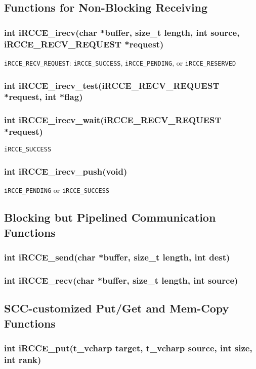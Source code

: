 \documentclass[fontsize=10pt, paper=a4, DIV12, pagesize=auto]{scrartcl}
\begin{document}
\subsection{Functions for Non-Blocking Receiving}
\subsubsection{int iRCCE\_irecv(char *buffer, size\_t length, int source, iRCCE\_RECV\_REQUEST *request)}\vspace{-0.3cm}
\texttt{iRCCE\_RECV\_REQUEST}: \texttt{iRCCE\_SUCCESS}, \texttt{iRCCE\_PENDING}, or \texttt{iRCCE\_RESERVED}
\subsubsection{int iRCCE\_irecv\_test(iRCCE\_RECV\_REQUEST *request, int *flag)}\vspace{-0.3cm}
\subsubsection{int iRCCE\_irecv\_wait(iRCCE\_RECV\_REQUEST *request)}\vspace{-0.3cm}
\texttt{iRCCE\_SUCCESS}
\subsubsection{int iRCCE\_irecv\_push(void)}\vspace{-0.3cm}
\texttt{iRCCE\_PENDING} or \texttt{iRCCE\_SUCCESS}
\subsection{Blocking but Pipelined Communication Functions}
\subsubsection{int iRCCE\_send(char *buffer, size\_t length, int dest)}\vspace{-0.3cm}
\subsubsection{int iRCCE\_recv(char *buffer, size\_t length, int source)}\vspace{-0.3cm}
\subsection{SCC-customized Put/Get and Mem-Copy Functions}
\subsubsection{int iRCCE\_put(t\_vcharp target, t\_vcharp source, int size, int rank)}\vspace{-0.3cm}
\end{document}
